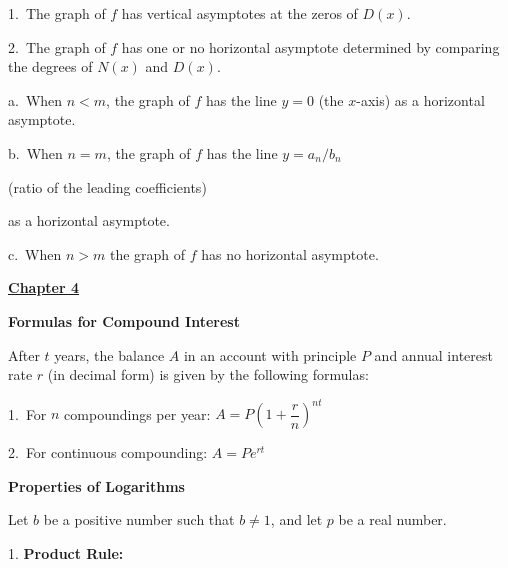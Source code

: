 \documentclass{article}
\begin{document}
\begin{large}
\begin{normalsize}

\hspace{0.2in} 1.\ The graph of $f$ has vertical asymptotes at the zeros of $D(x)$.

\hspace{0.2in} 2.\ The graph of $f$ has one or no horizontal asymptote determined by comparing the degrees of $N(x)$ and $D(x)$.

\hspace{0.3in}a.\ When $n < m$, the graph of $f$ has the line $y = 0$ (the $x$-axis) as a horizontal asymptote.

\hspace{0.3in}b.\ When $n = m$, the graph of $f$ has the line $y = a_{n}/b_{n}$ \begin{small}(ratio of the leading coefficients)\end{small} as a horizontal asymptote.

\hspace{0.3in}c.\ When $n > m$ the graph of $f$ has no horizontal asymptote.

\end{normalsize}

\vspace{0.25in}

\underline{\textbf{\huge Chapter 4 \phantom{ } \phantom{ } \phantom{ } \phantom{ }}}

\textbf{Formulas for Compound Interest}

\hspace{0.1in} After $t$ years, the balance $A$ in an account with principle $P$ and annual interest rate $r$ (in decimal form) is given by the following formulas:

\hspace{0.2in} 1.\ For $n$ compoundings per year: \hspace{0.5in} $A = P\left(1 + \dfrac{r}{n}\right)^{nt}$


\hspace{0.2in} 2.\ For continuous compounding: \hspace{0.5in}  $A = Pe^{rt}$

\textbf{Properties of Logarithms}

\hspace{0.1in} Let $b$ be a positive number such that $b \neq 1$, and let $p$ be a real number.

 
1. \textbf{Product Rule:} \hspace{1.0in}{\Large $\log_b (M \cdot N) = \log_b (M) + \log_b (N)$}


\end{large}
\end{document}

